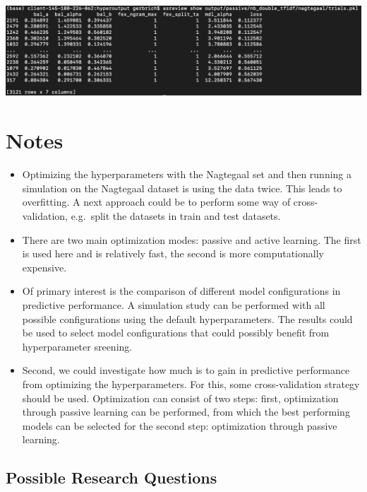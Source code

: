 \documentclass[
]{book}
\begin{document}
\includegraphics[width=23in]{figs/myfirstsim/optmizationresult}

\hypertarget{notes}{%
\section{Notes}\label{notes}}

\begin{itemize}
\item
  Optimizing the hyperparameters with the Nagtegaal set and then running a simulation on the Nagtegaal dataset is using the data twice.
  This leads to overfitting. A next approach could be to perform some way of cross-validation, e.g.~split the datasets in train and test datasets.
\item
  There are two main optimization modes: passive and active learning.
  The first is used here and is relatively fast, the second is more computationally expensive.
\item
  Of primary interest is the comparison of different model configurations in predictive performance.
  A simulation study can be performed with all possible configurations using the default hyperparameters.
  The results could be used to select model configurations that could possibly benefit from hyperparameter sreening.
\item
  Second, we could investigate how much is to gain in predictive performance from optimizing the hyperparameters.
  For this, some cross-validation strategy should be used.
  Optimization can consist of two steps:
  first, optimization through passive learning can be performed, from which the best performing models can be selected for the second step:
  optimization through passive learning.
\end{itemize}

\hypertarget{possible-research-questions}{%
\subsection{Possible Research Questions}\label{possible-research-questions}}
\end{document}
